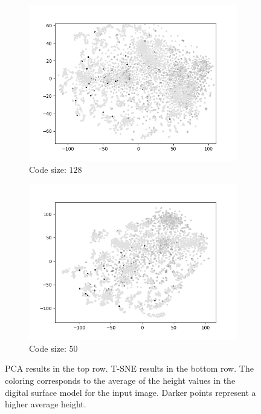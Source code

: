 \begin{figure}[H]
\begin{subfigure}{.25\textwidth}
        \includegraphics[width=\textwidth]{images/figures/experiments_latent/convolutional_dim128_dsm.png}  
        \caption{Code size: $128$} 
    \end{subfigure}%
    \begin{subfigure}{.25\textwidth}
        \centering
        \includegraphics[width=\textwidth]{images/figures/experiments_latent/convolutional_dim50_dsm.png}
        \caption{Code size: $50$}
    \end{subfigure}
    \caption{PCA results in the top row. 
    T-SNE results in the bottom row.  
    The coloring corresponds to the average of the height values in the digital surface model for the
    input image. Darker points represent a higher average height.}
\end{figure} \label{figure_heights_convolutional}

